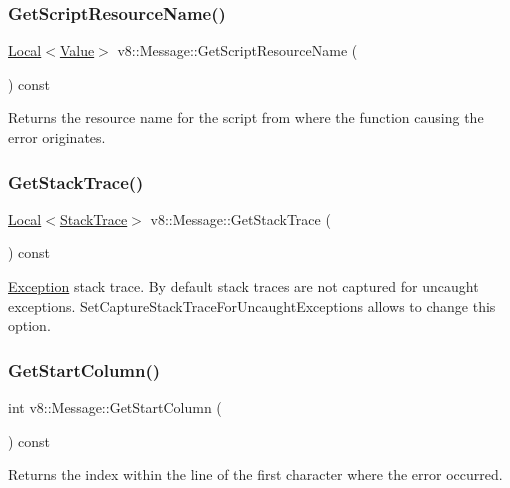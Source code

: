 \subsubsection{\texorpdfstring{Get\+Script\+Resource\+Name()}{GetScriptResourceName()}}
{\footnotesize\ttfamily \mbox{\hyperlink{classv8_1_1Local}{Local}}$<$\mbox{\hyperlink{classv8_1_1Value}{Value}}$>$ v8\+::\+Message\+::\+Get\+Script\+Resource\+Name (\begin{DoxyParamCaption}{ }\end{DoxyParamCaption}) const}

Returns the resource name for the script from where the function causing the error originates. \mbox{\label{classv8_1_1Message_a4b10ab26bf81c74301bcd93750fd077e}} 
\subsubsection{\texorpdfstring{Get\+Stack\+Trace()}{GetStackTrace()}}
{\footnotesize\ttfamily \mbox{\hyperlink{classv8_1_1Local}{Local}}$<$\mbox{\hyperlink{classv8_1_1StackTrace}{Stack\+Trace}}$>$ v8\+::\+Message\+::\+Get\+Stack\+Trace (\begin{DoxyParamCaption}{ }\end{DoxyParamCaption}) const}

\mbox{\hyperlink{classv8_1_1Exception}{Exception}} stack trace. By default stack traces are not captured for uncaught exceptions. Set\+Capture\+Stack\+Trace\+For\+Uncaught\+Exceptions allows to change this option. \mbox{\label{classv8_1_1Message_a3be9714cc977899bc1c935b00a140969}} 
\subsubsection{\texorpdfstring{Get\+Start\+Column()}{GetStartColumn()}}
{\footnotesize\ttfamily int v8\+::\+Message\+::\+Get\+Start\+Column (\begin{DoxyParamCaption}{ }\end{DoxyParamCaption}) const}

Returns the index within the line of the first character where the error occurred. \mbox{\label{classv8_1_1Message_a8c32ad25c164ecec1bae0293449589f4}} 
